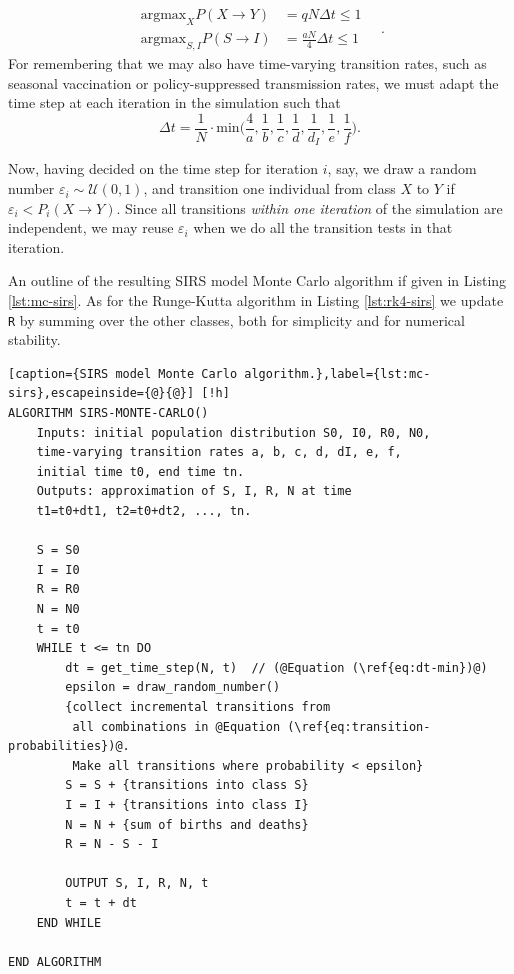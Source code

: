 \documentclass[]{article}
\begin{document}
\begin{equation}
\begin{aligned}
	\mathrm{argmax}_X  P(X \rightarrow Y) &= qN \Delta t \le 1 \\
	\mathrm{argmax}_{S,I} P(S \rightarrow I) &= \frac{aN}{4} \Delta t \le 1
\end{aligned} \quad .
\end{equation}
For remembering that we may also have time-varying transition rates, such as seasonal vaccination or policy-suppressed transmission rates, we must adapt the time step at each iteration in the simulation such that
\begin{equation} \label{eq:dt-min}
	\Delta t = \frac{1}{N} \cdot \mathrm{min} \bigg( \frac{4}{a}, \frac{1}{b}, \frac{1}{c}, \frac{1}{d}, \frac{1}{d_I}, \frac{1}{e}, \frac{1}{f} \bigg).
\end{equation}

Now, having decided on the time step for iteration $i$, say, we draw a random number $\varepsilon_i \sim \mathcal{U}(0,1)$, and transition one individual from class $X$ to $Y$ if $\varepsilon_i < P_i(X \rightarrow Y)$. Since all transitions \textit{within one iteration} of the simulation are independent, we may reuse $\varepsilon_i$ when we do all the transition tests in that iteration. 

An outline of the resulting SIRS model Monte Carlo algorithm if given in Listing \ref{lst:mc-sirs}. As for the Runge-Kutta algorithm in Listing \ref{lst:rk4-sirs} we update \lstinline|R| by summing over the other classes, both for simplicity and for numerical stability.

\begin{lstlisting}[caption={SIRS model Monte Carlo algorithm.},label={lst:mc-sirs},escapeinside={@}{@}] [!h]
ALGORITHM SIRS-MONTE-CARLO()
	Inputs: initial population distribution S0, I0, R0, N0,
	time-varying transition rates a, b, c, d, dI, e, f,
	initial time t0, end time tn.
	Outputs: approximation of S, I, R, N at time
	t1=t0+dt1, t2=t0+dt2, ..., tn.
	
	S = S0
	I = I0
	R = R0
	N = N0
	t = t0
	WHILE t <= tn DO
		dt = get_time_step(N, t)  // (@Equation (\ref{eq:dt-min})@)
		epsilon = draw_random_number()
		{collect incremental transitions from 
		 all combinations in @Equation (\ref{eq:transition-probabilities})@.
		 Make all transitions where probability < epsilon}
		S = S + {transitions into class S}
		I = I + {transitions into class I}
		N = N + {sum of births and deaths}
		R = N - S - I
		
		OUTPUT S, I, R, N, t
		t = t + dt
	END WHILE

END ALGORITHM
\end{lstlisting}
\end{document}
